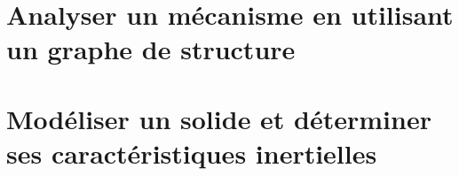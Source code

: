 \graphicspath{{\repStyle/png/}{../DYN/DYN-01/02_R/images/}} 
 
 
\graphicspath{{\repStyle/png/}{../DYN/DYN-01/14_Sympact/images/}} 
 
 
\graphicspath{{\repStyle/png/}{../DYN/DYN-01/61_Hemostase/images/}} 
 
 
\graphicspath{{\repStyle/png/}{../DYN/DYN-01/61_Hemostase_02/images/}} 
 
 
\graphicspath{{\repStyle/png/}{../DYN/DYN-01/63_BancHydraulique/images/}} 
 
 
\clearpage 
\newpage 
\section{Analyser un mécanisme en utilisant un graphe de structure} 
\clearpage 
\newpage 
\section{Modéliser un solide et déterminer ses caractéristiques inertielles} 
\graphicspath{{\repStyle/png/}{../DYN/DYN-03-Inertie/40_Parallelepipede/images/}} 
 
 
\graphicspath{{\repStyle/png/}{../DYN/DYN-03-Inertie/41_Parallelepipede/images/}} 
 
 
\graphicspath{{\repStyle/png/}{../DYN/DYN-03-Inertie/42_Cylindre/images/}} 
 
 
\graphicspath{{\repStyle/png/}{../DYN/DYN-03-Inertie/43_Cylindre/images/}} 
 
 
\graphicspath{{\repStyle/png/}{../DYN/DYN-03-Inertie/44_Disque/images/}} 
 
 
\graphicspath{{\repStyle/png/}{../DYN/DYN-03-Inertie/45_Disque/images/}} 
 
 
\graphicspath{{\repStyle/png/}{../DYN/DYN-03-Inertie/50_BancBalafre/images/}} 
 
 
